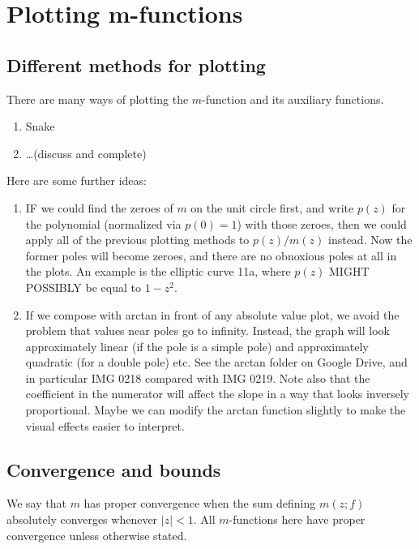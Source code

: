 \documentclass[a4paper]{amsart}
\begin{document}
\section{Plotting m-functions}


\subsection{Different methods for plotting}

There are many ways of plotting the $m$-function and its auxiliary functions.

\begin{enumerate}
\item Snake
\item \ldots (discuss and complete)
\end{enumerate}

Here are some further ideas:

\begin{enumerate}
\item IF we could find the zeroes of $m$ on the unit circle first, and write $p(z)$ for the polynomial (normalized via $p(0) = 1$) with those zeroes, then we could apply all of the previous plotting methods to $p(z)/m(z)$ instead. Now the former poles will become zeroes, and there are no obnoxious poles at all in the plots. An example is the elliptic curve 11a, where $p(z)$ MIGHT POSSIBLY be equal to $1-z^2$.
\item If we compose with arctan in front of any absolute value plot, we avoid the problem that values near poles go to infinity. Instead, the graph will look approximately linear (if the pole is a simple pole) and approximately quadratic (for a double pole) etc. See the arctan folder on Google Drive, and in particular IMG 0218 compared with IMG 0219. Note also that the coefficient in the numerator will affect the slope in a way that looks inversely proportional. Maybe we can modify the arctan function slightly to make the visual effects easier to interpret.
\end{enumerate}



\subsection{Convergence and bounds}

\begin{definition}
  We say that $m$ has proper convergence when the sum defining $m(z; f)$ absolutely converges whenever $|z| < 1$. All $m$-functions here have proper convergence unless otherwise stated.
\end{definition}
\end{document}
